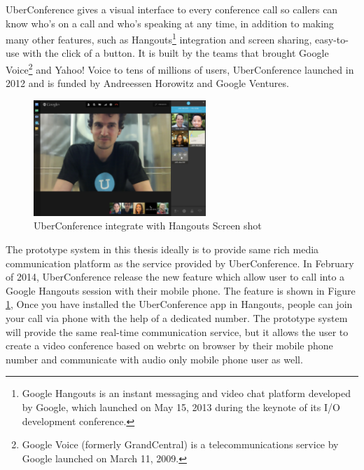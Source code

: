 \par UberConference gives a visual interface to every conference call so callers can know who's on a call and who's speaking at any time, in addition to making many other features, such as Hangouts\footnote{Google Hangouts is an instant messaging and video chat platform developed by Google, which launched on May 15, 2013 during the keynote of its I/O development conference.\cite{wiki:hangouts}} integration and screen sharing, easy-to-use with the click of a button. It is built by the teams that brought Google Voice\footnote{Google Voice (formerly GrandCentral) is a telecommunications service by Google launched on March 11, 2009.\cite{wiki:googleVoice}} and Yahoo! Voice to tens of millions of users, UberConference launched in 2012 and is funded by Andreessen Horowitz and Google Ventures.\cite{web:uberconference}

\begin{figure}
	\centering
    	\includegraphics[width=0.58\textwidth,natwidth=610,natheight=642]{figs/uberconference_hangout.jpg}
  	\caption{UberConference integrate with Hangouts Screen shot\cite{tnw:uberconference}}
  	\label{fig:uberconference}
\end{figure}

\par The prototype system in this thesis ideally is to provide same rich media communication platform as the service provided by UberConference. In February of 2014, UberConference release the new feature which allow user to call into a Google Hangouts session with their mobile phone. The feature is shown in Figure \ref{fig:uberconference}, Once you have installed the UberConference app in Hangouts, people can join your call via phone with the help of a dedicated number. The prototype system will provide the same real-time communication service, but it allows the user to create a video conference based on \gls{webrtc} on browser by their mobile phone number and communicate with audio only mobile phone user as well. 

